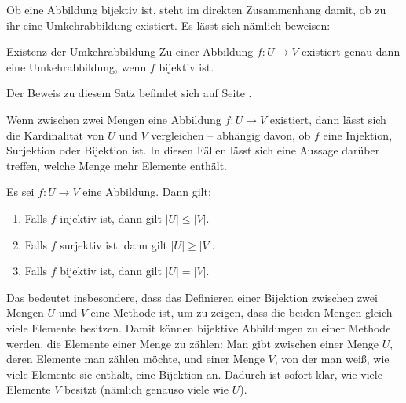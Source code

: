 \documentclass[../../main.tex]{subfiles}
\begin{document}
Ob eine Abbildung bijektiv ist, steht im direkten Zusammenhang damit, ob zu ihr eine Umkehrabbildung existiert. Es lässt sich nämlich beweisen:

\begin{theorem}{Existenz der Umkehrabbildung}
    Zu einer Abbildung $f\colon U\rightarrow V$ existiert genau dann eine Umkehrabbildung, wenn $f$ bijektiv ist.
\end{theorem}

Der Beweis zu diesem Satz befindet sich auf Seite \pageref{proof:existenceOfInverseMap}.

Wenn zwischen zwei Mengen eine Abbildung $f\colon U\rightarrow V$ existiert, dann lässt sich die Kardinalität von $U$ und $V$ vergleichen -- abhängig davon, ob $f$ eine Injektion, Surjektion oder Bijektion ist. In diesen Fällen lässt sich eine Aussage darüber treffen, welche Menge mehr Elemente enthält.

\begin{theorem}{}
    Es sei $f\colon U\rightarrow V$ eine Abbildung. Dann gilt:
    \begin{enumerate}
        \item Falls $f$ injektiv ist, dann gilt $|U|\leq |V|$.
        \item Falls $f$ surjektiv ist, dann gilt $|U|\geq |V|$.
        \item Falls $f$ bijektiv ist, dann gilt $|U|=|V|$.
    \end{enumerate}
\end{theorem}

Das bedeutet insbesondere, dass das Definieren einer Bijektion zwischen zwei Mengen $U$ und $V$ eine Methode ist, um zu zeigen, dass die beiden Mengen gleich viele Elemente besitzen. Damit können bijektive Abbildungen zu einer Methode werden, die Elemente einer Menge zu zählen: Man gibt zwischen einer Menge $U$, deren Elemente man zählen möchte, und einer Menge $V$, von der man weiß, wie viele Elemente sie enthält, eine Bijektion an. Dadurch ist sofort klar, wie viele Elemente $V$ besitzt (nämlich genauso viele wie $U$).
\end{document}

